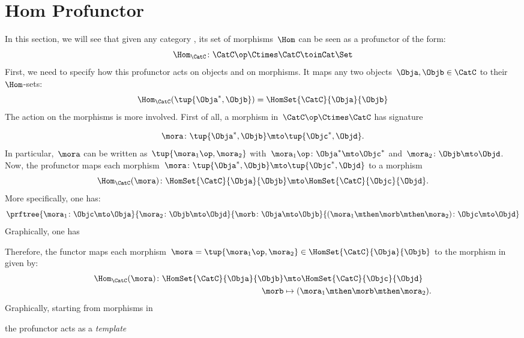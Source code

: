 
\section{Hom Profunctor}

In this section, we will see that given any category \CatC, its set of morphisms~$\Hom$ can be seen as a profunctor of the form:
\begin{equation}
	\label{eq:hom-signature}
	\Hom_\CatC\colon \CatC \op \Ctimes \CatC \toinCat \Set
\end{equation}
First, we need to specify how this profunctor acts on objects and on morphisms.
It maps any two objects~$\Obja,\Objb\in \CatC$ to their~$\Hom$-sets:
\begin{equation}
	\label{eq:hom-action}
	\Hom_\CatC(\tup{\Obja^*,\Objb})=\HomSet{\CatC}{\Obja}{\Objb}
\end{equation}
The action on the morphisms is more involved.
First of all, a morphism in~$\CatC\op \Ctimes \CatC$ has signature~

\begin{equation}
	\label{eq:hom0}
	\mora \colon \tup{\Obja^*,\Objb}\mto \tup{\Objc^*, \Objd}.
\end{equation}
%
In particular,~$\mora$ can be written as~$\tup{\mora_1\op,\mora_2}$ with~$\mora_1\op\colon \Obja^*\mto \Objc^*$ and~$\mora_2\colon \Objb\mto \Objd$.
Now, the profunctor maps each morphism~$\mora \colon \tup{\Obja^*,\Objb}\mto \tup{\Objc^*, \Objd}$ to a morphism
%
\begin{equation}
	\label{eq:hom2}
	\Hom_\CatC(\mora)\colon \HomSet{\CatC}{\Obja}{\Objb}\mto \HomSet{\CatC}{\Objc}{\Objd}.
\end{equation}
%
More specifically, one has:
%
\begin{equation}
	\label{eq:hom3}
	\prftree{\mora_1\colon \Objc \mto \Obja}{\mora_2\colon \Objb\mto \Objd}{\morb\colon \Obja\mto \Objb}{(\mora_1\mthen \morb \mthen \mora_2)\colon \Objc\mto \Objd}
\end{equation}
%
Graphically, one has
\begin{center}
\end{center}
%
Therefore, the functor maps each morphism~$\mora=\tup{\mora_1\op,\mora_2}\in \HomSet{\CatC}{\Obja}{\Objb}$ to the morphism in \Set given by:
%
\begin{equation}
	\label{eq:hom4}
	\begin{aligned}
		\Hom_\CatC(\mora)\colon \HomSet{\CatC}{\Obja}{\Objb} & \mto \HomSet{\CatC}{\Objc}{\Objd}             \\
		\morb                                                & \mapsto (\mora_1\mthen \morb \mthen \mora_2).
	\end{aligned}
\end{equation}
%
Graphically, starting from morphisms in \CatC
\begin{center}
\end{center}
the profunctor acts as a \emph{template}
\begin{center}
\end{center}


